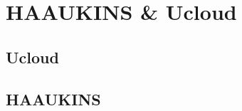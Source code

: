 \chapter{HAAUKINS \& \ac{Ucloud}}

\section{\ac{Ucloud}}

\label{sec:ucloud}
\section{\ac{HAAUKINS}}

\label{sec:haaukins}